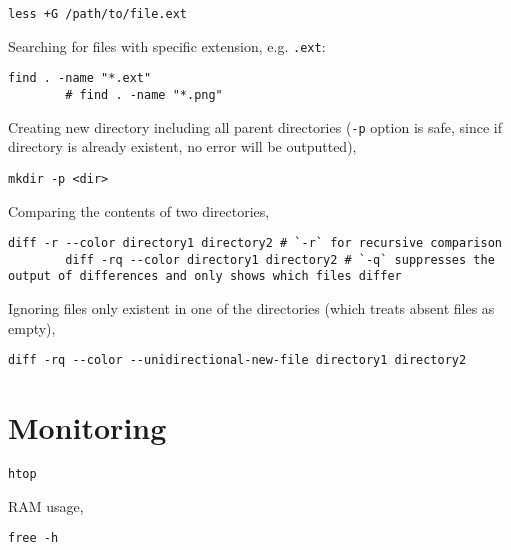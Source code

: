 \documentclass[12pt, a4paper]{scrbook}
\numberwithin{equation}{section}
\theoremstyle{definition}
\theoremstyle{definition}
\begin{document}
	\begin{lstlisting}[style=mystylebash, label=alg:less__bottom_scroll, xleftmargin=\parindent]
		less +G /path/to/file.ext
	\end{lstlisting}

	Searching for files with specific extension, e.g. \texttt{.ext}: 
	
	\begin{lstlisting}[style=mystylebash, label=alg:bash_find, xleftmargin=\parindent]
		find . -name "*.ext"
		# find . -name "*.png"
	\end{lstlisting}
	
	Creating new directory including all parent directories (\texttt{-p} option is safe, since if directory is already existent, 
	no error will be outputted),
	
	\begin{lstlisting}[style=mystylebash, label=alg:bash__dir_creation, xleftmargin=\parindent]
		mkdir -p <dir>
	\end{lstlisting}
	
	Comparing the contents of two directories,
	
	\begin{lstlisting}[style=mystylebash, label=alg:bash_diff__dir, xleftmargin=\parindent]
		diff -r --color directory1 directory2 # `-r` for recursive comparison
		diff -rq --color directory1 directory2 # `-q` suppresses the output of differences and only shows which files differ
	\end{lstlisting}
	
	Ignoring files only existent in one of the directories (which treats absent files as empty),
	
	\begin{lstlisting}[style=mystylebash, label=alg:, xleftmargin=\parindent]
		diff -rq --color --unidirectional-new-file directory1 directory2 
	\end{lstlisting}

	\section{Monitoring}
	
	\begin{lstlisting}[style=mystylebash, label=alg:htop, xleftmargin=\parindent]
		htop
	\end{lstlisting}

	RAM usage,
	
	\begin{lstlisting}[style=mystylebash, label=alg:free, xleftmargin=\parindent]
		free -h
	\end{lstlisting}
\end{document}
